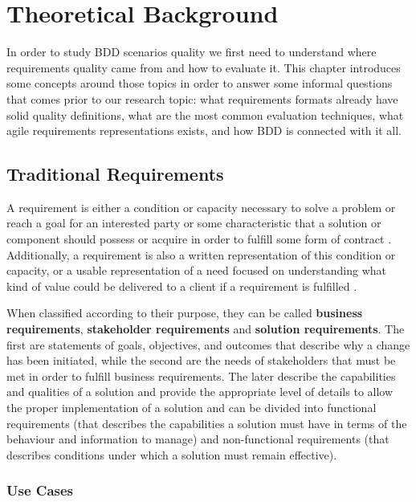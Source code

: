 \chapter{\label{chap:chap4}{Theoretical Background}}

In order to study BDD scenarios quality we first need to understand where requirements quality came from and how to evaluate it. This chapter introduces some concepts around those topics in order to answer some informal questions that comes prior to our research topic: what requirements formats already have solid quality definitions, what are the most common evaluation techniques, what agile requirements representations exists, and how BDD is connected with it all.     

\section{Traditional Requirements}

A requirement is either a condition or capacity necessary to solve a problem or reach a goal for an interested party or some characteristic that a solution or component should possess or acquire in order to fulfill some form of contract \cite{Babok_2009}. Additionally, a requirement is also a written representation of this condition or capacity, or a usable representation of a need focused on understanding what kind of value could be delivered to a client if a requirement is fulfilled \cite{Babok_2015}. 

When classified according to their purpose, they can be called \textbf{business requirements}, \textbf{stakeholder requirements} and \textbf{solution requirements}. The first are statements of goals, objectives, and outcomes that describe why a change has been initiated, while the second are the needs of stakeholders that must be met in order to fulfill business requirements. The later describe the capabilities and qualities of a solution and provide the appropriate level of details to allow the proper implementation of a solution and can be divided into functional requirements (that describes the capabilities a solution must have in terms of the behaviour and information to manage) and non-functional requirements (that describes conditions under which a solution must remain effective). 

\subsection{Use Cases}

